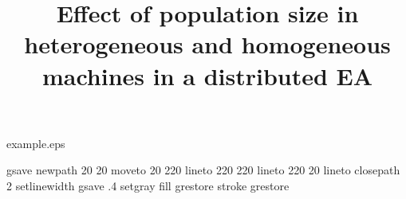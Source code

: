 %
%
%
%
%
\begin{filecontents*}{example.eps}





gsave
newpath
  20 20 moveto
  20 220 lineto
  220 220 lineto
  220 20 lineto
closepath
2 setlinewidth
gsave
  .4 setgray fill
grestore
stroke
grestore
\end{filecontents*}
%
\RequirePackage{fix-cm}
%
\documentclass[twocolumn]{svjour3}          %
%
\smartqed  %
%
\usepackage{graphicx}
\usepackage{color}
\usepackage{listings}
\usepackage{fancyvrb}
\usepackage{url}
\usepackage{fix2col}
\usepackage{natbib}
\usepackage{epsfig}
\usepackage{algorithm}
\usepackage{algorithmic}
%

\lstset{
basicstyle=\ttfamily \scriptsize,
language=java,
frame=single,
stringstyle=\ttfamily,
showstringspaces=false
}

%
%
%
%
%
\providecommand{\e}[1]{\ensuremath{\times 10^{#1}}}


\title{Effect of population size in heterogeneous and homogeneous machines in a distributed EA%
}

